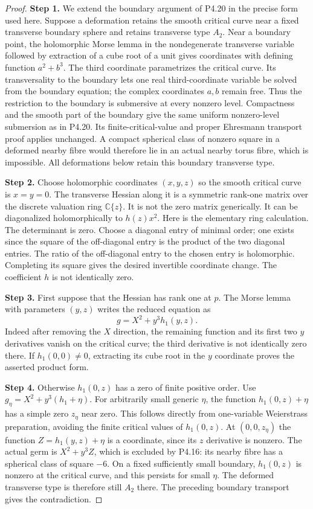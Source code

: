 \begin{proof}
\noindent\textbf{Step 1.} We extend the boundary argument of P4.20 in the
precise form used here. Suppose a deformation retains
the smooth critical curve near a fixed transverse
boundary sphere and retains transverse type $A_2$.
Near a boundary point, the holomorphic Morse lemma
in the nondegenerate transverse variable followed
by extraction of a cube root of a unit gives
coordinates with defining function $a^2+b^3$.
The third coordinate parametrizes the critical
curve. Its transversality to the boundary lets
one real third-coordinate variable be solved
from the boundary equation; the complex
coordinates $a,b$ remain free. Thus the
restriction to the boundary is submersive
at every nonzero level. Compactness and
the smooth part of the boundary give the
same uniform nonzero-level submersion as
in P4.20. Its finite-critical-value and
proper Ehresmann transport proof applies
unchanged. A compact spherical class of
nonzero square in a deformed nearby
fibre would therefore lie in an actual
nearby torus fibre, which is impossible.
All deformations below retain this
boundary transverse type.

\noindent\textbf{Step 2.} Choose holomorphic coordinates $(x,y,z)$
so the smooth critical curve is $x=y=0$.
The transverse Hessian along it is a
symmetric rank-one matrix over the
discrete valuation ring $\mathbb C\{z\}$.
It is not the zero matrix generically.
It can be diagonalized holomorphically
to $h(z)x^2$. Here is the elementary
ring calculation. The determinant is
zero. Choose a diagonal entry of
minimal order; one exists since the
square of the off-diagonal entry is
the product of the two diagonal entries.
The ratio of the off-diagonal entry
to the chosen entry is holomorphic.
Completing its square gives the desired
invertible coordinate change. The
coefficient $h$ is not identically zero.

\noindent\textbf{Step 3.} First suppose that the Hessian has
rank one at $p$. The Morse lemma with
parameters $(y,z)$ writes the reduced
equation as
\[
 g=X^2+y^3h_1(y,z).
\]
Indeed after removing the $X$ direction,
the remaining function and its first
two $y$ derivatives vanish on the
critical curve; the third derivative
is not identically zero there. If
$h_1(0,0)\ne0$, extracting its cube
root in the $y$ coordinate proves the
asserted product form.

\noindent\textbf{Step 4.} Otherwise $h_1(0,z)$ has a zero of
finite positive order. Use
$g_\eta=X^2+y^3(h_1+\eta)$.
For arbitrarily small generic $\eta$,
the function $h_1(0,z)+\eta$ has a
simple zero $z_\eta$ near zero.
This follows directly from one-variable
Weierstrass preparation, avoiding the
finite critical values of $h_1(0,z)$.
At $(0,0,z_\eta)$ the function
$Z=h_1(y,z)+\eta$ is a coordinate,
since its $z$ derivative is nonzero.
The actual germ is
$X^2+y^3Z$, which is excluded by
P4.16: its nearby fibre has a
spherical class of square $-6$.
On a fixed sufficiently small boundary,
$h_1(0,z)$ is nonzero at the critical
curve, and this persists for small
$\eta$. The deformed transverse type
is therefore still $A_2$ there.
The preceding boundary transport gives
the contradiction.


\end{proof}
